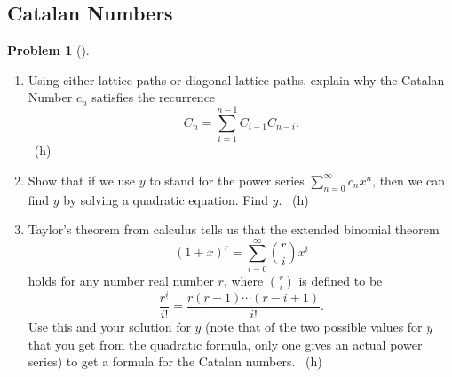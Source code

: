 \documentclass[10pt,]{book}
\theoremstyle{plain}
\theoremstyle{definition}
\newtheorem{activity}[project]{Problem}
\theoremstyle{definition}
\numberwithin{equation}{chapter}
\newcommand{\importantarrow}{\Rightarrow}
\begin{document}
\subsection[{Catalan Numbers}]{Catalan Numbers}\label{subsection-50}
\begin{activity}[]\marginsymbol[-1em]{\pdftooltip{$\importantarrow$}{especially interesting}} \label{CatalanRecurrence}
\leavevmode%
\begin{enumerate}[font=\bfseries,label=(\alph*),ref=\alph*]
\item\label{task-165} \marginsymbol[-2.5em]{} \hypertarget{p-1275}{}%
Using either lattice paths or diagonal lattice paths, explain why the Catalan Number \(c_n\) satisfies the recurrence%
\begin{equation*}
C_n = \sum_{i=1}^{n-1} C_{i-1}C_{n-i}\text{.}
\end{equation*}
%
~{\tiny (h)}\item\label{task-166} \marginsymbol[-2.5em]{} \hypertarget{p-1278}{}%
Show that if we use \(y\) to stand for the power series \(\sum_{n=0}^\infty c_nx^n\), then we can find \(y\) by solving a quadratic equation. Find \(y\).%
~{\tiny (h)}\item\label{task-167} \marginsymbol[-2.5em]{} \hypertarget{p-1281}{}%
Taylor's theorem from calculus tells us that the extended binomial theorem%
\begin{equation*}
(1+x)^r = \sum_{i=0}^\infty \binom{r}{i}x^i
\end{equation*}
holds for any number real number \(r\), where \(\binom{r}{i}\) is defined to be%
\begin{equation*}
\frac{r^{\underline{i}}}{i!} = \frac{r(r-1)\cdots(r-i+1)}{i!}  \text{.}
\end{equation*}
Use this and your solution for \(y\) (note that of the two possible values for \(y\) that you get from the quadratic formula, only one gives an actual power series) to get a formula for the Catalan numbers.%
~{\tiny (h)}\end{enumerate}
\end{activity}
\typeout{************************************************}
\typeout{************************************************}
\end{document}
